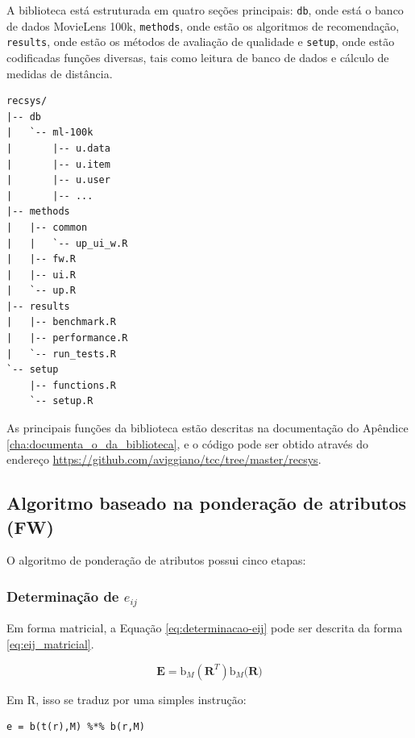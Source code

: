 A biblioteca está estruturada em quatro seções principais: \texttt{db}, onde está o banco de dados MovieLens 100k, \texttt{methods}, onde estão os algoritmos de recomendação, \texttt{results}, onde estão os métodos de avaliação de qualidade e \texttt{setup}, onde estão codificadas funções diversas, tais como leitura de banco de dados e cálculo de medidas de distância.

\begin{lstlisting}[caption=Estrutura da biblioteca]
recsys/
|-- db
|   `-- ml-100k
|       |-- u.data
|       |-- u.item
|       |-- u.user
|       |-- ...
|-- methods
|   |-- common
|   |   `-- up_ui_w.R
|   |-- fw.R
|   |-- ui.R
|   `-- up.R
|-- results
|   |-- benchmark.R
|   |-- performance.R
|   `-- run_tests.R
`-- setup
    |-- functions.R
    `-- setup.R
\end{lstlisting}

As principais funções da biblioteca estão descritas na documentação do Apêndice \ref{cha:documenta_o_da_biblioteca}, e o código pode ser obtido através do endereço \url{https://github.com/aviggiano/tcc/tree/master/recsys}.


\subsection{Algoritmo baseado na ponderação de atributos (FW)} %
\label{sub:algoritmo_baseado_na_pondera_o_de_atributos_fw_}

O algoritmo de ponderação de atributos possui cinco etapas: 

\subsubsection{Determinação de $e_{ij}$} %
\label{ssub:determina_o_de_e__ij_}

Em forma matricial, a Equação \ref{eq:determinacao-eij} pode ser descrita da forma \ref{eq:eij_matricial}.

\begin{equation}
\label{eq:eij_matricial}
\mathbf{E} = \mathrm{b}_M\left(\mathbf{R}^T\right) \mathrm{b}_M\big(\mathbf{R}\big)
\end{equation}

Em R, isso se traduz por uma simples instrução:

\begin{lstlisting}[caption=Determinação de $e_{ij}$]
e = b(t(r),M) %*% b(r,M)
\end{lstlisting}

